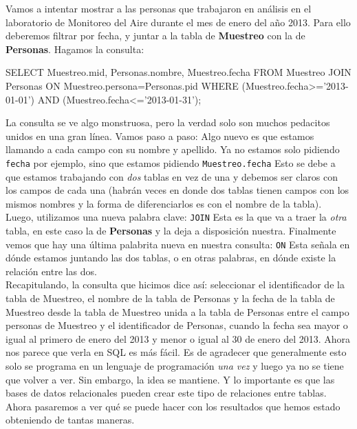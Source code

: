 \documentclass[10pt,letterpaper]{article}
\newcommand{\inlinecode}[1]{
\colorbox{light-gray}{\texttt{#1}}
}
\newenvironment{Code}
{
\begin{lrbox}{\selvestebox}%
\begin{minipage}{\dimexpr\columnwidth-2\fboxsep\relax}
\fontfamily{\ttdefault}\selectfont
}
{\end{minipage}\end{lrbox}%
\begin{center}
\colorbox{light-gray}{\usebox{\selvestebox}}
\end{center}
}
\begin{document}
Vamos a intentar mostrar a las personas que trabajaron en an\'alisis en el laboratorio de Monitoreo del Aire durante el mes de enero del a\~no 2013. Para ello deberemos filtrar por fecha, y juntar a la tabla de \textbf{Muestreo} con la de \textbf{Personas}. Hagamos la consulta:

\begin{Code}
SELECT Muestreo.mid, Personas.nombre, Muestreo.fecha FROM Muestreo JOIN Personas ON Muestreo.persona=Personas.pid WHERE (Muestreo.fecha>='2013-01-01') AND (Muestreo.fecha<='2013-01-31');
\end{Code}

La consulta se ve algo monstruosa, pero la verdad solo son muchos pedacitos unidos en una gran l\'inea. Vamos paso a paso: Algo nuevo es que estamos llamando a cada campo con su nombre y apellido. Ya no estamos solo pidiendo \inlinecode{fecha} por ejemplo, sino que estamos pidiendo \inlinecode{Muestreo.fecha} Esto se debe a que estamos trabajando con \emph{dos} tablas en vez de una y debemos ser claros con los campos de cada una (habr\'an veces en donde dos tablas tienen campos con los mismos nombres y la forma de diferenciarlos es con el nombre de la tabla). Luego, utilizamos una nueva palabra clave: \inlinecode{JOIN} Esta es la que va a traer la \emph{otra} tabla, en este caso la de \textbf{Personas} y la deja a disposici\'on nuestra. Finalmente vemos que hay una \'ultima palabrita nueva en nuestra consulta: \inlinecode{ON} Esta se\~nala en d\'onde estamos juntando las dos tablas, o en otras palabras, en d\'onde existe la relaci\'on entre las dos.\\

Recapitulando, la consulta que hicimos dice as\'i: seleccionar el identificador de la tabla de Muestreo, el nombre de la tabla de Personas y la fecha de la tabla de Muestreo desde la tabla de Muestreo unida a la tabla de Personas entre el campo personas de Muestreo y el identificador de Personas, cuando la fecha sea mayor o igual al primero de enero del 2013 y menor o igual al 30 de enero del 2013. Ahora nos parece que verla en SQL es m\'as f\'acil. Es de agradecer que generalmente esto solo se programa en un lenguaje de programaci\'on \emph{una vez} y luego ya no se tiene que volver a ver. Sin embargo, la idea se mantiene. Y lo importante es que las bases de datos relacionales pueden crear este tipo de relaciones entre tablas. Ahora pasaremos a ver qu\'e se puede hacer con los resultados que hemos estado obteniendo de tantas maneras.
\end{document}
